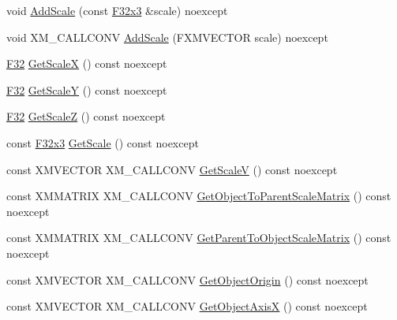 \begin{DoxyCompactItemize}
\item 
void \mbox{\hyperlink{classmage_1_1_local_transform_a3bf03266ca3266cd1eecab3b3dd73e77}{Add\+Scale}} (const \mbox{\hyperlink{namespacemage_a0fef5ab4e073c2d9ea876fefa3da4233}{F32x3}} \&scale) noexcept
\item 
void X\+M\+\_\+\+C\+A\+L\+L\+C\+O\+NV \mbox{\hyperlink{classmage_1_1_local_transform_a1c2ae4604dfd52b8a58356eb78ac99bf}{Add\+Scale}} (F\+X\+M\+V\+E\+C\+T\+OR scale) noexcept
\item 
\mbox{\hyperlink{namespacemage_aa97e833b45f06d60a0a9c4fc22ae02c0}{F32}} \mbox{\hyperlink{classmage_1_1_local_transform_ad539c04b897276a35bd3f25ad2163371}{Get\+ScaleX}} () const noexcept
\item 
\mbox{\hyperlink{namespacemage_aa97e833b45f06d60a0a9c4fc22ae02c0}{F32}} \mbox{\hyperlink{classmage_1_1_local_transform_a8c15528f78365b5dc853d1e9035b4cc4}{Get\+ScaleY}} () const noexcept
\item 
\mbox{\hyperlink{namespacemage_aa97e833b45f06d60a0a9c4fc22ae02c0}{F32}} \mbox{\hyperlink{classmage_1_1_local_transform_a79225f12e49fce5d16653ad2671a7e97}{Get\+ScaleZ}} () const noexcept
\item 
const \mbox{\hyperlink{namespacemage_a0fef5ab4e073c2d9ea876fefa3da4233}{F32x3}} \mbox{\hyperlink{classmage_1_1_local_transform_a5dbf74dae200448b0993504d23f99f1c}{Get\+Scale}} () const noexcept
\item 
const X\+M\+V\+E\+C\+T\+OR X\+M\+\_\+\+C\+A\+L\+L\+C\+O\+NV \mbox{\hyperlink{classmage_1_1_local_transform_a6c70ee804326d0b5ff54d282630972bc}{Get\+ScaleV}} () const noexcept
\item 
const X\+M\+M\+A\+T\+R\+IX X\+M\+\_\+\+C\+A\+L\+L\+C\+O\+NV \mbox{\hyperlink{classmage_1_1_local_transform_acd4fda032325f52cb668fc4733c6bc04}{Get\+Object\+To\+Parent\+Scale\+Matrix}} () const noexcept
\item 
const X\+M\+M\+A\+T\+R\+IX X\+M\+\_\+\+C\+A\+L\+L\+C\+O\+NV \mbox{\hyperlink{classmage_1_1_local_transform_a81ef828c64270716e5095f2cf571fad7}{Get\+Parent\+To\+Object\+Scale\+Matrix}} () const noexcept
\item 
const X\+M\+V\+E\+C\+T\+OR X\+M\+\_\+\+C\+A\+L\+L\+C\+O\+NV \mbox{\hyperlink{classmage_1_1_local_transform_abaa858e23864984b339b2fa26607c026}{Get\+Object\+Origin}} () const noexcept
\item 
const X\+M\+V\+E\+C\+T\+OR X\+M\+\_\+\+C\+A\+L\+L\+C\+O\+NV \mbox{\hyperlink{classmage_1_1_local_transform_a369350f17dbf41afa8278643bb641125}{Get\+Object\+AxisX}} () const noexcept
\item 

\end{DoxyCompactItemize}
